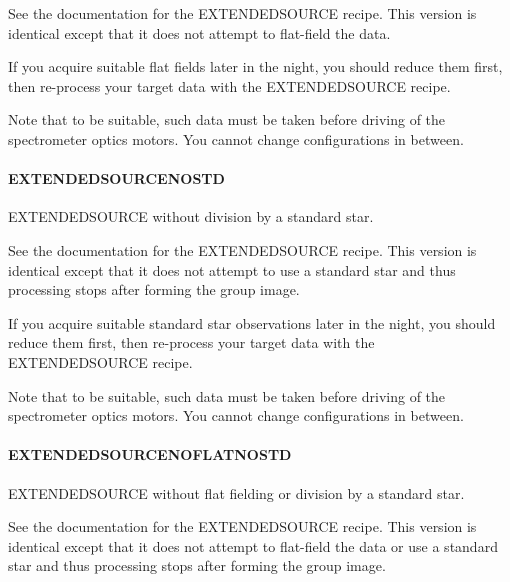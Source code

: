 \documentclass[twoside,11pt]{article}
\renewcommand{\_}{\texttt{\symbol{95}}}
\begin{document}
\mbox{}


See the documentation for the EXTENDED\_SOURCE recipe. This version is
identical except that it does not attempt to flat-field the data.



If you acquire suitable flat fields later in the night, you should
reduce them first, then re-process your target data with the
EXTENDED\_SOURCE recipe.



Note that to be suitable, such data must be taken before driving
of the spectrometer optics motors. You cannot change configurations
in between.

\paragraph{EXTENDED\_SOURCE\_NOSTD\label{EXTENDED_SOURCE_NOSTD}}


EXTENDED\_SOURCE without division by a standard star.


\mbox{}


See the documentation for the EXTENDED\_SOURCE recipe. This version is
identical except that it does not attempt to use a standard star and
thus processing stops after forming the group image.



If you acquire suitable standard star observations later in the night,
you should reduce them first, then re-process your target data with
the EXTENDED\_SOURCE recipe.



Note that to be suitable, such data must be taken before driving
of the spectrometer optics motors. You cannot change configurations
in between.

\paragraph{EXTENDED\_SOURCE\_NOFLAT\_NOSTD\label{EXTENDED_SOURCE_NOFLAT_NOSTD}}


EXTENDED\_SOURCE without flat fielding or
division by a standard star.


\mbox{}


See the documentation for the EXTENDED\_SOURCE recipe. This version is
identical except that it does not attempt to flat-field the data or
use a standard star and thus processing stops after forming the group
image.
\end{document}
